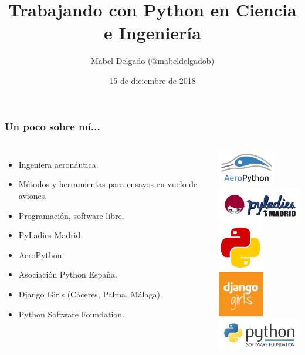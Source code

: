 \documentclass[18pt]{beamer}
\title{Trabajando con Python en Ciencia e Ingeniería}
\author{Mabel Delgado (@mabeldelgadob)}
\institute{PyDay Granada 2018}
\date{15 de diciembre de 2018}
\begin{document}
\begin{frame}
	\titlepage
\end{frame}

\begin{frame}
	\frametitle{Un poco sobre mí...}
	\begin{columns}
		\begin{itemize}
			\setlength\itemsep{0.7em}		
			\item Ingeniera aeronáutica.
			\item Métodos y herramientas para ensayos en vuelo de aviones.
			\item Programación, software libre.
			\item PyLadies Madrid.
			\item AeroPython.
			\item Asociación Python España.
			\item Django Girls (Cáceres, Palma, Málaga).
			\item Python Software Foundation.
		\end{itemize}
			
		\centering
			\includegraphics[width=2.5cm]{images/aeropython.png}\\
			\includegraphics[width=4cm]{images/pyladiesmadrid_alargado.png}\\
			\includegraphics[width=2cm]{images/python_spain.png}
			\includegraphics[width=2cm]{images/django_girls.jpg}\\
			\includegraphics[width=4cm]{images/psf.png}
		\end{columns}
\end{frame}
\end{document}
